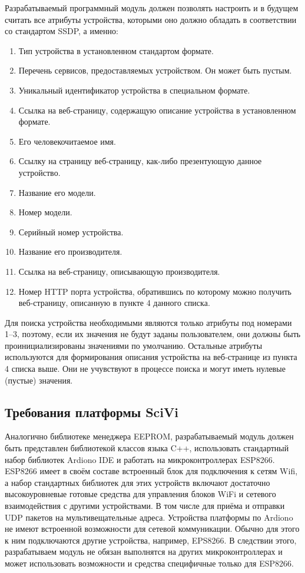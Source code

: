 Разрабатываемый программный модуль должен позволять настроить и в будущем считать все атрибуты устройства, которыми оно должно обладать в соответствии со стандартом SSDP, а именно:
\begin{enumerate}
	\item Тип устройства в установленном стандартом формате.
	\item Перечень сервисов, предоставляемых устройством.
	Он может быть пустым.
	\item Уникальный идентификатор устройства в специальном формате.
	\item Ссылка на веб-страницу, содержащую описание устройства в установленном формате.
	\item Его человекочитаемое имя.
	\item Ссылку на страницу веб-страницу, как-либо презентующую данное устройство.
	\item Название его модели.
	\item Номер модели.
	\item Серийный номер устройства.
	\item Название его производителя.
	\item Ссылка на веб-страницу, описывающую производителя.
	\item Номер HTTP порта устройства, обратившись по которому можно получить веб-страницу, описанную в пункте 4 данного списка.
\end{enumerate}

Для поиска устройства необходимыми являются только атрибуты под номерами 1--3, поэтому, если их значения не будут заданы пользователем, они должны быть проинициализированы значениями по умолчанию.
Остальные атрибуты используются для формирования описания устройства на веб-странице из пункта 4 списка выше.
Они не учувствуют в процессе поиска и могут иметь нулевые (пустые) значения.

\subsection{Требования платформы SciVi}

Аналогично библиотеке менеджера EEPROM, разрабатываемый модуль должен быть представлен библиотекой классов языка C++, использовать стандартный набор библиотек Ardiono IDE и работать на микроконтроллерах ESP8266.
ESP8266 имеет в своём составе встроенный блок для подключения к сетям Wifi, а набор стандартных библиотек для этих устройств включают достаточно высокоуровневые готовые средства для управления блоков WiFi и сетевого взаимодействия с другими устройствами. 
В том числе для приёма и отправки UDP пакетов на мультивещательные адреса.
Устройства платформы по Ardiono не имеют встроенной возможности для сетевой коммуникации.
Обычно для этого к ним подключаются другие устройства, например, EPS8266.
В следствии этого, разрабатываем модуль не обязан выполнятся на других микроконтроллерах и может использовать возможности и средства специфичные только для ESP8266.

